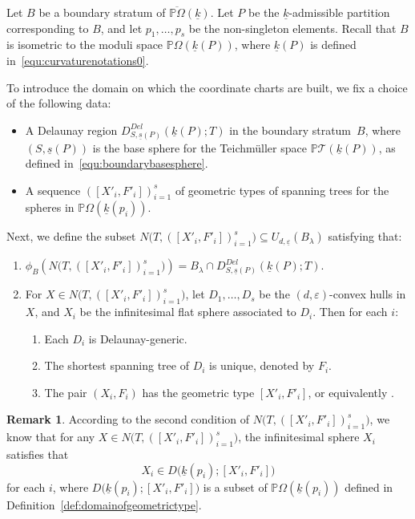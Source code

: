 \documentclass{compositio}
\numberwithin{equation}{section}
\numberwithin{figure}{section}
\theoremstyle{definition}
\newtheorem{remark}[definition]{Remark}
\theoremstyle{plain}
\begin{document}
{Let $B$ be a boundary stratum of  $\overline{\mathbb{P}\Omega}(\underline{k})$. Let $P$ be the $\underline{k}$-admissible partition corresponding to $B$, and let $p_1, \ldots, p_s$ be the non-singleton elements. Recall that $B$ is isometric to the moduli space $\mathbb{P}\Omega(\underline{k}(P))$, where $\underline{k}(P)$ is defined in~\eqref{equ:curvaturenotations0}.

To introduce the domain on which the coordinate charts are built, we fix a choice of the following data:
\begin{itemize}
    \item A Delaunay region $D_{S,\underline{s}(P)}^{Del}(\underline{k}(P);T)$ in the boundary stratum~$B$, where $(S,\underline{s}(P))$ is the base sphere for the Teichmüller space $\mathbb{P}\mathcal{T}(\underline{k}(P))$, as defined in~\eqref{equ:boundarybasesphere}.
    \item A sequence $([X'_i, F'_i])_{i=1}^s$ of geometric types of spanning trees for the spheres in $\mathbb{P}\Omega(\underline{k}(p_i))$.
\end{itemize}


Next, we define the subset $N\big(T, ([X'_i, F'_i])_{i=1}^s\big) \subseteq U_{d,\underline{\varepsilon}}(B_{\lambda})$ satisfying that:
\begin{enumerate}
    \item $\phi_B\left(N\big(T, ([X'_i, F'_i])_{i=1}^s\big)\right) = B_{\lambda} \cap D_{S,\underline{s}(P)}^{Del}(\underline{k}(P);T)$.
    \item For $X \in N\big(T, ([X'_i, F'_i])_{i=1}^s\big)$, let $D_1, \ldots, D_s$ be the $(d,\varepsilon)$-convex hulls in $X$,  and $X_i$ be the infinitesimal flat sphere associated to $D_i$. Then for each $i$:
    \begin{enumerate}
        \item Each $D_i$ is Delaunay-generic.
        \item The shortest spanning tree of $D_i$ is unique, denoted by $F_i$.
        \item The pair $(X_i, F_i)$ has the geometric type $[X'_i, F'_i]$, or equivalently .
    \end{enumerate}
\end{enumerate}

\begin{remark}\label{rmk:projectiontoinfinitesimalspheres}
    According to the second condition of $N\big(T, ([X'_i, F'_i])_{i=1}^s\big)$, we know that for any $X\in N\big(T, ([X'_i, F'_i])_{i=1}^s\big)$,  the infinitesimal sphere $X_i$ satisfies that
    $$
    X_i\in D\big(\underline{k}(p_i); [X'_i,F'_i]\big)
    $$
    for each $i$, where $D\big(\underline{k}(p_i); [X'_i,F'_i]\big)$ is a subset of $\mathbb{P}\Omega(\underline{k}(p_i))$ defined in Definition~\ref{def:domainofgeometrictype}.
\end{remark}

}
\end{document}
